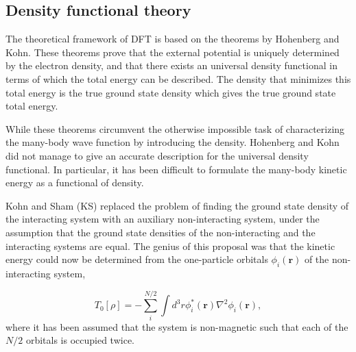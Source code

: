 \documentclass[12pt,a4paper,twoside]{article}
\numberwithin{equation}{section}
\renewcommand{\_}{\textscale{.7}{\textunderscore}}
\begin{document}
\subsection{Density functional theory}
The theoretical framework of DFT is based on the theorems by Hohenberg and Kohn\cite{Hohenberg-Kohn}. These theorems prove that the external potential is uniquely determined by the electron density, and that there exists an universal density functional in terms of which the total energy can be described. The density that minimizes this total energy is the true ground state density which gives the true ground state total energy. 

While these theorems circumvent the otherwise impossible task of characterizing the many-body wave function by introducing the density. Hohenberg and Kohn did not manage to give an accurate description for the universal density functional. In particular, it has been difficult to formulate the many-body kinetic energy as a functional of density.

Kohn and Sham (KS) replaced the problem of finding the ground state density of the interacting system with an auxiliary non-interacting system, under the assumption that the ground state densities of the non-interacting and the interacting systems are equal\cite{Kohn-Sham}. The genius of this proposal was that the kinetic energy could now be determined from the one-particle orbitals $\phi_i(\textbf{r})$ of the non-interacting system, 

\begin{equation}
    T_0[\rho] = -\sum_{i}^{N/2}\int d^3r \phi_i^*(\textbf{r})\nabla^2\phi_i(\textbf{r}), 
\end{equation}
where it has been assumed that the system is non-magnetic such that each of the $N/2$ orbitals is occupied twice.
\end{document}
